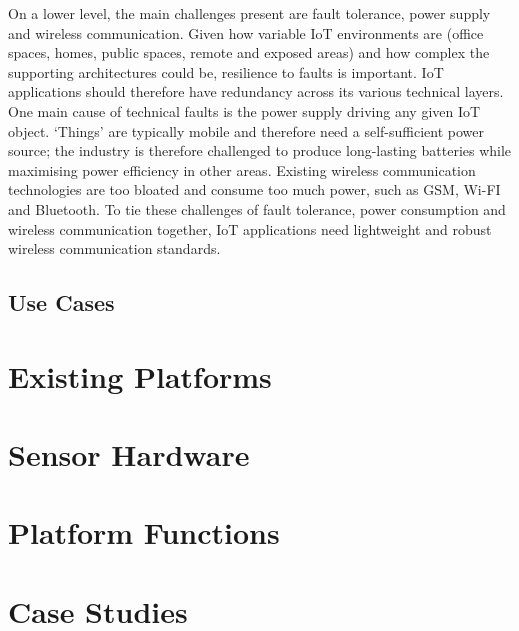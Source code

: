         On a lower level, the main challenges present are fault tolerance, power supply and wireless communication. Given how variable IoT environments are (office spaces, homes, public spaces, remote and exposed areas) and how complex the supporting architectures could be, resilience to faults is important. IoT applications should therefore have redundancy across its various technical layers. One main cause of technical faults is the power supply driving any given IoT object. `Things' are typically mobile and therefore need a self-sufficient power source; the industry is therefore challenged to produce long-lasting batteries while maximising power efficiency in other areas. Existing wireless communication technologies are too bloated and consume too much power, such as GSM, Wi-FI and Bluetooth. To tie these challenges of fault tolerance, power consumption and wireless communication together, IoT applications need lightweight and robust wireless communication standards.

    \subsection{Use Cases}
  \section{Existing Platforms}
  \section{Sensor Hardware}
  \section{Platform Functions}
  \section{Case Studies}